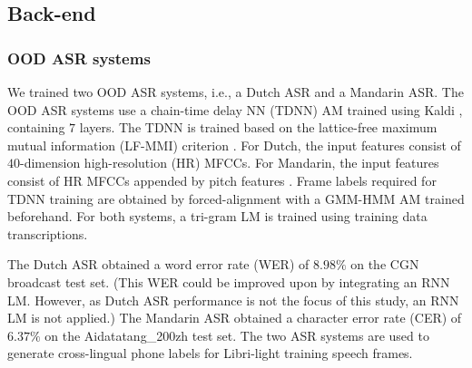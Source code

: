 \documentclass[a4paper]{article}
\begin{document}
\subsection{Back-end}
\subsubsection{OOD ASR systems}
\label{subsubsec:oodasr}
We trained two OOD ASR systems, i.e., a Dutch ASR and a Mandarin ASR.
The OOD ASR systems use a chain-time delay NN (TDNN) AM \cite{povey2016purely} trained using Kaldi \cite{povey2011kaldi}, containing $7$   layers.  The TDNN   is trained based on the lattice-free maximum mutual information (LF-MMI) criterion \cite{povey2016purely}.
For Dutch, the input features consist of $40$-dimension high-resolution (HR) MFCCs. For Mandarin, the input  features consist of HR MFCCs  appended by 
pitch features \cite{ghahremani2014pitch}. 
Frame labels required for TDNN training are obtained by forced-alignment with a GMM-HMM AM trained beforehand. 
 For both systems, a tri-gram LM is trained using training data transcriptions.

The Dutch ASR obtained a word error rate (WER) of $8.98\%$ on the CGN broadcast test set. 
(This   WER could be improved upon by integrating an   RNN LM. However, as Dutch ASR performance is not the focus of this study, an RNN LM is not applied.)
The Mandarin ASR obtained a character error rate (CER) of $6.37\%$ on the Aidatatang\_200zh test set.
The two ASR systems are used to generate cross-lingual phone labels for Libri-light training speech frames.

\end{document}
